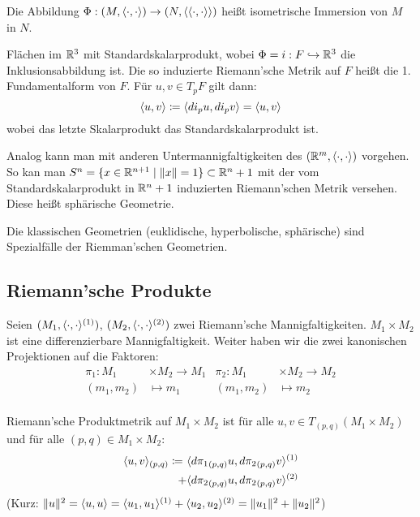 \documentclass[a4paper,twoside,DIV15,BCOR12mm]{scrbook}
\begin{document}
Die Abbildung $\Phi: (M,\langle\cdot,\cdot\rangle) \to (N,\langle\langle\cdot,\cdot\rangle\rangle)$ heißt isometrische Immersion von $M$ in $N$.

\begin{beispiel}
Flächen im $\mathbb{R}^3$ mit Standardskalarprodukt, wobei $\Phi=i: F \hookrightarrow \mathbb{R}^3$ die Inklusionsabbildung ist. Die so induzierte Riemann’sche Metrik auf $F$ heißt die 1. Fundamentalform von $F$. Für $u,v \in T_pF$ gilt dann:
\[
\langle u,v\rangle \da \langle di_pu, di_pv\rangle = \langle u, v\rangle
\]
wobei das letzte Skalarprodukt das Standardskalarprodukt ist.
\end{beispiel}

Analog kann man mit anderen Untermannigfaltigkeiten des $(\mathbb{R}^m,\langle\cdot,\cdot\rangle)$ vorgehen. So kan man $S^n = \{x\in\mathbb{R}^{n+1}\mid \|x\|=1\}\subset \mathbb{R}^n+1$ mit der vom Standardskalarprodukt in $\mathbb{R}^n+1$ induzierten Riemann’schen Metrik versehen. Diese heißt sphärische Geometrie.

\begin{bemerkung}
Die klassischen Geometrien (euklidische, hyperbolische, sphärische) sind Spezialfälle der Riemman’schen Geometrien.
\end{bemerkung}

\subsection{Riemann’sche Produkte}
Seien $(M_1, \langle\cdot,\cdot\rangle^{(1)})$, $(M_2, \langle\cdot,\cdot\rangle^{(2)})$ zwei Riemann’sche Mannigfaltigkeiten. $M_1\times M_2$ ist eine differenzierbare Mannigfaltigkeit. Weiter haben wir die zwei kanonischen Projektionen auf die Faktoren:
\begin{align*}
\pi_1: M_1&\times M_2 \to M_1 &
\pi_2: M_1&\times M_2 \to M_2 \\
(m_1,m_2) &\mapsto m_1 &
(m_1,m_2) &\mapsto m_2 \\
\end{align*}

\begin{definition}
Riemann’sche Produktmetrik auf $M_1\times M_2$ ist für alle $u,v\in T_{(p,q)}(M_1\times M_2)$ und für alle $(p,q)\in M_1\times M_2$:
\begin{align*}
\ksp uv_{(p,q)} \da \ & \ksp {d{\pi_1}_{(p,q)} u}{ d{\pi_2}_{(p,q)}v}^{(1)} \\
+ &\ksp {d{\pi_2}_{(p,q)} u}{ d{\pi_2}_{(p,q)}v}^{(2)}
\end{align*}
(Kurz: $\|u\|^2 = \langle u,u\rangle = \langle u_1,u_1\rangle^{(1)} + \langle u_2,u_2\rangle^{(2)} = \|u_1\|^2 + \|u_2\|^2$)
\end{definition}
\end{document}
